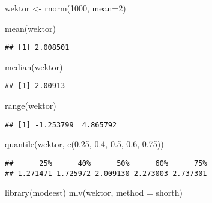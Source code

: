 \documentclass[
]{book}
\newenvironment{Shaded}{\begin{snugshade}}{\end{snugshade}}
\newcommand{\AttributeTok}[1]{\textcolor[rgb]{0.77,0.63,0.00}{#1}}
\newcommand{\DecValTok}[1]{\textcolor[rgb]{0.00,0.00,0.81}{#1}}
\newcommand{\FloatTok}[1]{\textcolor[rgb]{0.00,0.00,0.81}{#1}}
\newcommand{\FunctionTok}[1]{\textcolor[rgb]{0.00,0.00,0.00}{#1}}
\newcommand{\NormalTok}[1]{#1}
\newcommand{\OtherTok}[1]{\textcolor[rgb]{0.56,0.35,0.01}{#1}}
\newcommand{\StringTok}[1]{\textcolor[rgb]{0.31,0.60,0.02}{#1}}
\begin{document}
\begin{Shaded}
\begin{Highlighting}[]
\NormalTok{wektor }\OtherTok{\textless{}{-}} \FunctionTok{rnorm}\NormalTok{(}\DecValTok{1000}\NormalTok{, }\AttributeTok{mean=}\DecValTok{2}\NormalTok{)}

\FunctionTok{mean}\NormalTok{(wektor)}
\end{Highlighting}
\end{Shaded}

\begin{verbatim}
## [1] 2.008501
\end{verbatim}

\begin{Shaded}
\begin{Highlighting}[]
\FunctionTok{median}\NormalTok{(wektor)}
\end{Highlighting}
\end{Shaded}

\begin{verbatim}
## [1] 2.00913
\end{verbatim}

\begin{Shaded}
\begin{Highlighting}[]
\FunctionTok{range}\NormalTok{(wektor)}
\end{Highlighting}
\end{Shaded}

\begin{verbatim}
## [1] -1.253799  4.865792
\end{verbatim}

\begin{Shaded}
\begin{Highlighting}[]
\FunctionTok{quantile}\NormalTok{(wektor, }\FunctionTok{c}\NormalTok{(}\FloatTok{0.25}\NormalTok{, }\FloatTok{0.4}\NormalTok{, }\FloatTok{0.5}\NormalTok{, }\FloatTok{0.6}\NormalTok{, }\FloatTok{0.75}\NormalTok{))}
\end{Highlighting}
\end{Shaded}

\begin{verbatim}
##      25%      40%      50%      60%      75% 
## 1.271471 1.725972 2.009130 2.273003 2.737301
\end{verbatim}

\begin{Shaded}
\begin{Highlighting}[]
\FunctionTok{library}\NormalTok{(modeest)}
\FunctionTok{mlv}\NormalTok{(wektor, }\AttributeTok{method =} \StringTok{\textquotesingle{}shorth\textquotesingle{}}\NormalTok{)}
\end{Highlighting}
\end{Shaded}
\end{document}
